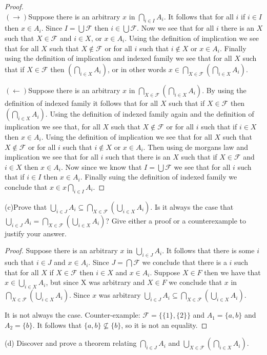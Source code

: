 \documentclass{article}
\begin{document}
\begin{proof}$ $\\

$(\rightarrow)$Suppose there is an arbitrary $x$ in $\bigcap_{i\in I}A_i$. It follows that for all $i$ if $i \in I$ then $x \in A_i$. Since $I=\bigcup \mathcal{F}$ then $i \in \bigcup \mathcal{F}$. Now we see that  for all $i$ there is an $X$ such that $X \in \mathcal{F}$ and $i \in X$, or $x \in A_i$. Using the definition of implication we see that for all $X$ such that $X \notin \mathcal{F}$ or  for all $i$ such that $i \notin X$ or $x \in A_i$. Finally using the definition of implication and indexed family we see that for all $X$ such that if $X \in \mathcal{F}$ then  $(\bigcap_{i\in X}A_i)$, or in other words $x \in \bigcap_{X\in \mathcal{F}}(\bigcap_{i\in X}A_i)$.


$(\leftarrow)$Suppose there is an arbitrary $x$ in $\bigcap_{X\in \mathcal{F}}(\bigcap_{i\in X}A_i)$. By using the definition of indexed family it follows that for all $X$ such that if $X \in \mathcal{F}$ then $(\bigcap_{i\in X}A_i)$. Using the definition of indexed family again and the definition of implication we see that, for all $X$ such that $X \notin \mathcal{F}$ or for all $i$ such that if $i \in X$ then $x \in A_i$. Using the definition of implication we see that for all $X$  such that $X \notin \mathcal{F}$ or for all $i$ such that $i \notin X$ or $x \in A_i$. Then using de morgans law and implication we see that for all $i$ such that there is an $X$ such that if $X \in \mathcal{F}$ and $i \in X$ then $x \in A_i$. Now since we know that $I=\bigcup \mathcal{F}$ we see that for all $i$ such that if $i \in I$ then $x \in A_i$. Finally suing the definition of indexed family we conclude that $x \in x \bigcap_{i\in I}A_i$.
\end{proof}$ $\\
(c)Prove that $\bigcup_{i\in J}A_i \subseteq \bigcap_{X\in \mathcal{F}}(\bigcup_{i\in X}A_i)$. Is it always the case that $\bigcup_{i \in J}A_i=\bigcap_{X \in \mathcal{F}}(\bigcup_{i\in X}A_i)$? Give either a proof or a counterexample to justify your answer.$ $\\

\begin{proof}
Suppose there is an arbitrary $x$ in $\bigcup_{i\in J}A_i$. It follows that there is some $i$ such that $i \in J$ and $x \in A_i$. Since $J=\bigcap \mathcal{F}$ we conclude that there is a $i$ such that for all $X$ if $X \in \mathcal{F}$ then $i \in X$ and $x \in A_i$. Suppose $X \in F$ then we have that $x \in \bigcup_{i\in X}A_i$, but since X was arbitrary and $X \in F$ we conclude that $x$ in$\bigcap_{X\in \mathcal{F}}(\bigcup_{i\in X}A_i)$. Since $x$ was arbitrary $\bigcup_{i\in J}A_i \subseteq \bigcap_{X\in \mathcal{F}}(\bigcup_{i\in X}A_i)$.

It is not always the case. Counter-example: $\mathcal{F}=\{\{1\},\{2\}\}$ and $A_1=\{a,b\}$ and $A_2=\{b\}$.
It follows that $\{a,b\}\nsubseteq \{b\}$, so it is not an equality.
\end{proof}
$ $\\
\newpage
(d) Discover and prove a theorem relating $\bigcap_{i \in J}A_i$ and $\bigcup_{X \in \mathcal{F}}(\bigcap_{i\in X}A_i)$.
\end{document}
